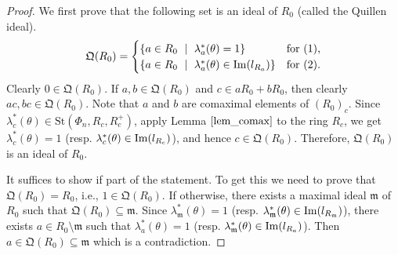 \documentclass[11pt]{amsart}
\theoremstyle{definition}
\numberwithin{equation}{section}
\numberwithin{equation}{section}
\newcommand{\Img}{{\rm Im}}
\newcommand{\<}{\langle}
\renewcommand{\>}{\rangle}
\newcommand{\St}{\mathrm{St}}
\begin{document}
\begin{proof}
    We first prove that the following set is an ideal of $R_{0}$ (called the Quillen ideal). \[\mathfrak{Q}(R_{0})=\begin{cases}
        \{a\in R_{0}~\mid~\lambda^{\ast}_{a}(\theta)=1\}  & \text{for (1),} \\
    \{a\in R_{0}~\mid~\lambda^{\ast}_{a}(\theta)\in \Img(l_{R_{a}})\} & \text{for (2)}.
    \end{cases}\]
    Clearly $0\in\mathfrak{Q}(R_{0})$. If $a,b\in \mathfrak{Q}(R_{0})$ and $c\in aR_{0}+bR_{0}$, then clearly $ac,bc\in \mathfrak{Q}(R_{0})$. Note that $a$ and $b$ are comaximal elements of $(R_{0})_{c}$. Since $\lambda^{\ast}_{c}(\theta)\in\St(\Phi_{n},R_{c},R^{+}_{c})$, apply Lemma $\ref{lem_comax}$ to the ring $R_{c}$, we get $\lambda^{\ast}_{c}(\theta)=1$ (resp. $\lambda^{\ast}_{c}(\theta)\in\Img(l_{R_{c}})$), and hence $c\in\mathfrak{Q}(R_{0})$. Therefore, $\mathfrak{Q}(R_{0})$ is an ideal of $R_{0}$. \par
    It suffices to show if part of the statement. To get this we need to prove that $\mathfrak{Q}(R_{0})=R_{0}$, i.e., $1\in \mathfrak{Q}(R_{0})$. If otherwise, there exists a maximal ideal $\mathfrak{m}$ of $R_{0}$ such that $\mathfrak{Q}(R_{0})\subseteq \mathfrak{m}$. Since $\lambda^{\ast}_{\mathfrak{m}}(\theta)=1$ (resp. $\lambda^{\ast}_{\mathfrak{m}}(\theta)\in \Img(l_{R_{\mathfrak{m}}})$), there exists $a\in R_{0}\setminus\mathfrak{m}$ such that $\lambda^{\ast}_{a}(\theta)=1$ (resp. $\lambda^{\ast}_{\mathfrak{m}}(\theta)\in \Img(l_{R_{a}})$). Then $a\in\mathfrak{Q}(R_{0})\subseteq \mathfrak{m}$ which is a contradiction. 
\end{proof}
\end{document}
